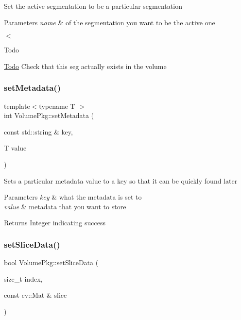 Set the active segmentation to be a particular segmentation 
\begin{DoxyParams}{Parameters}
{\em name} & of the segmentation you want to be the active one \\
\hline
\end{DoxyParams}
$<$\begin{DoxyRefDesc}{Todo}
\item[\hyperlink{todo__todo000001}{Todo}]Check that this seg actually exists in the volume \end{DoxyRefDesc}
\hypertarget{classVolumePkg_a560d401f04a486c0277e37b3e2607886}{}\label{classVolumePkg_a560d401f04a486c0277e37b3e2607886} 
\subsubsection{\texorpdfstring{set\+Metadata()}{setMetadata()}}
{\footnotesize\ttfamily template$<$typename T $>$ \\
int Volume\+Pkg\+::set\+Metadata (\begin{DoxyParamCaption}\item[{const std\+::string \&}]{key,  }\item[{T}]{value }\end{DoxyParamCaption})\hspace{0.3cm}{\ttfamily [inline]}}

Sets a particular metadata value to a key so that it can be quickly found later 
\begin{DoxyParams}{Parameters}
{\em key} & what the metadata is set to \\
\hline
{\em value} & metadata that you want to store \\
\hline
\end{DoxyParams}
\begin{DoxyReturn}{Returns}
Integer indicating success 
\end{DoxyReturn}
\hypertarget{classVolumePkg_a8d062ac46538de627f67f56ab35d6943}{}\label{classVolumePkg_a8d062ac46538de627f67f56ab35d6943} 
\subsubsection{\texorpdfstring{set\+Slice\+Data()}{setSliceData()}}
{\footnotesize\ttfamily bool Volume\+Pkg\+::set\+Slice\+Data (\begin{DoxyParamCaption}\item[{size\+\_\+t}]{index,  }\item[{const cv\+::\+Mat \&}]{slice }\end{DoxyParamCaption})}

